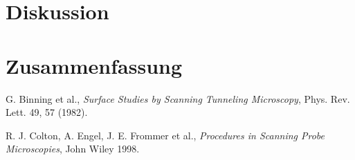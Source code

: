 \documentclass[10pt, a4paper]{article}
\begin{document}
\section{Diskussion}

\section{Zusammenfassung}


\begin{thebibliography}{9}

  G. Binning et al.,
  \emph{Surface Studies by Scanning Tunneling Microscopy},
  Phys. Rev. Lett. 49, 57 (1982).

  R. J. Colton, A. Engel, J. E. Frommer et al.,
  \emph{Procedures in Scanning Probe Microscopies},
  John Wiley 1998.
  
\end{thebibliography}
\end{document}
